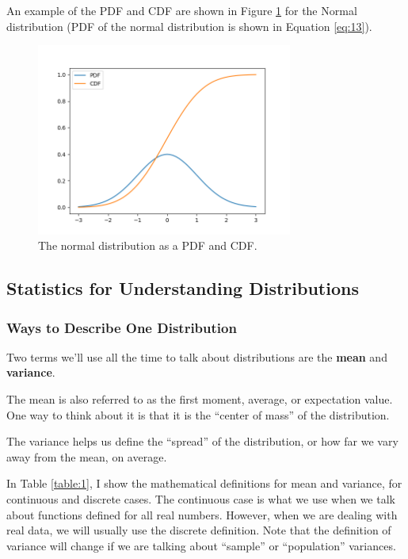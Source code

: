 \documentclass{article}
\begin{document}
  An example of the PDF and CDF are shown in Figure \ref{fig:pdfvcdf} for the Normal distribution (PDF of the normal distribution is shown in Equation \ref{eq:13}).

\begin{figure}[htbp]
\centerline{\includegraphics[width = 0.75\textwidth]{pdfvcdf.png}}
\caption[]{\label{fig:pdfvcdf} The normal distribution as a PDF and CDF.}
\end{figure}

\subsection{Statistics for Understanding Distributions}
\subsubsection{Ways to Describe One Distribution}
Two terms we'll use all the time to talk about distributions are the \textbf{mean} and \textbf{variance}.

The mean is also referred to as the first moment, average, or expectation value. One way to think about it is that it is the ``center of mass'' of the distribution.

The variance helps us define the ``spread'' of the distribution, or how far we vary away from the mean, on average.

In Table \ref{table:1}, I show the mathematical definitions for mean and variance, for continuous and discrete cases. The continuous case is what we use when we talk about functions defined for all real numbers. However, when we are dealing with real data, we will usually use the discrete definition. Note that the definition of variance will change if we are talking about ``sample'' or ``population'' variances. 
\end{document}
